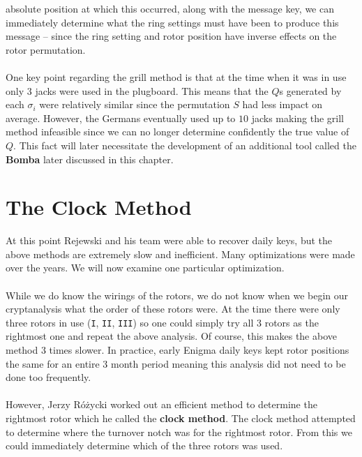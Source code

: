 absolute position at which this occurred, along with the message key,
we can immediately determine what the ring settings must have been to
produce this message -- since the ring setting and rotor position
have inverse effects on the rotor permutation.
\\\\One key point regarding the grill method is that at the time when
it was in use only $3$ jacks were used in the plugboard. This means
that the $Q$s generated by each $\sigma_i$ were relatively similar
since the permutation $S$ had less impact on average. However, the
Germans eventually used up to $10$ jacks making the grill method
infeasible since we can no longer determine confidently the true
value of $Q$. This fact will later necessitate the development of an
additional tool called the {\bf{Bomba}} later discussed in this chapter.
\section{The Clock Method}\label{clock_method}

At this point Rejewski and his team were able to recover daily keys,
but the above methods are extremely slow and inefficient. Many
optimizations were made over the years. We will now examine one
particular optimization.
\\\\While we do know the wirings of the rotors, we do not know when
we begin our cryptanalysis what the order of these rotors were. At
the time there were only three rotors in use (\texttt{I},
\texttt{II}, \texttt{III}) so one could simply try all 3 rotors as
the rightmost one and repeat the above analysis. Of course, this
makes the above method 3 times slower. In practice, early Enigma
daily keys kept rotor positions the same for an entire 3 month period
meaning this analysis did not need to be done too frequently.
\\\\However, Jerzy Różycki worked out an efficient method to
determine the rightmost rotor which he called the {\bf{clock
			method}}. The clock method attempted to determine where the turnover
notch was for the rightmost rotor. From this we could immediately
determine which of the three rotors was used.

